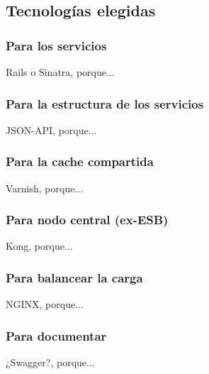 \subsection{Tecnologías elegidas}


\subsubsection{Para los servicios}

Rails o Sinatra, porque...

\subsubsection{Para la estructura de los servicios}

JSON-API, porque...

\subsubsection{Para la cache compartida}

Varnish, porque...

\subsubsection{Para nodo central (ex-ESB)}

Kong, porque...

\subsubsection{Para balancear la carga}

NGINX, porque...

\subsubsection{Para documentar}

¿Swagger?, porque...
